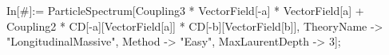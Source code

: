 In[#]:= ParticleSpectrum[Coupling3 * VectorField[-a] * VectorField[a] + Coupling2 * CD[-a][VectorField[a]] * CD[-b][VectorField[b]], TheoryName -> "LongitudinalMassive", Method -> "Easy", MaxLaurentDepth -> 3]; 